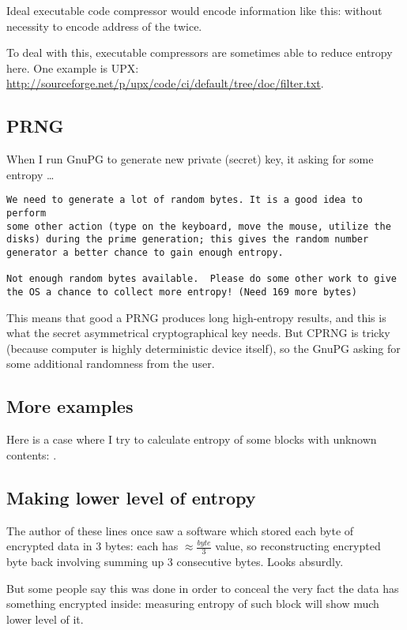 Ideal executable code compressor would encode information like this:
 without necessity to encode
address of the  twice.

To deal with this, executable compressors are sometimes able to reduce entropy here.
One example is UPX: \url{http://sourceforge.net/p/upx/code/ci/default/tree/doc/filter.txt}.

\subsection{\ac{PRNG}}

When I run GnuPG to generate new private (secret) key, it asking for some entropy \dots

\begin{lstlisting}
We need to generate a lot of random bytes. It is a good idea to perform
some other action (type on the keyboard, move the mouse, utilize the
disks) during the prime generation; this gives the random number
generator a better chance to gain enough entropy.

Not enough random bytes available.  Please do some other work to give
the OS a chance to collect more entropy! (Need 169 more bytes)
\end{lstlisting}

This means that good a \ac{PRNG} produces long high-entropy results,
and this is what the secret asymmetrical cryptographical key needs.
But \ac{CPRNG} is tricky (because computer is highly deterministic device itself),
so the GnuPG asking for some additional randomness from the user.

\subsection{More examples}

Here is a case where I try to calculate entropy of some blocks with unknown contents: .



\subsection{Making lower level of entropy}

The author of these lines once saw a software which stored each byte of encrypted data in 3 bytes:
each has {\Large $\approx \frac{byte}{3}$} value, so reconstructing encrypted byte back involving summing up 3 consecutive bytes.
Looks absurdly.

But some people say this was done in order to conceal the very fact
the data has something encrypted inside: measuring entropy of such block will show much lower level of it.

